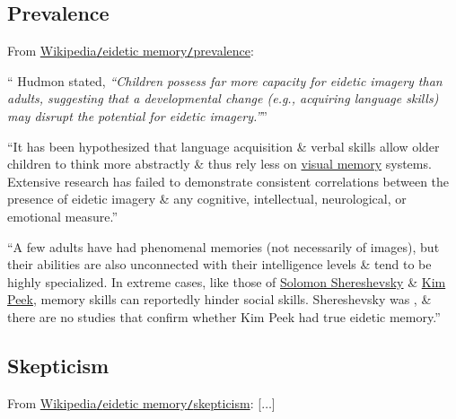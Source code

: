 \documentclass[oneside]{book}
\numberwithin{equation}{section}
\begin{document}
\subsection{Prevalence}
From \href{https://en.wikipedia.org/wiki/Eidetic_memory#Prevalence}{Wikipedia\texttt{/}eidetic memory\texttt{/}prevalence}:

`` Hudmon stated, \textit{``Children possess far more capacity for eidetic imagery than adults, suggesting that a developmental change (e.g., acquiring language skills) may disrupt the potential for eidetic imagery.''}''

``It has been hypothesized that language acquisition \& verbal skills allow older children to think more abstractly \& thus rely less on \href{https://en.wikipedia.org/wiki/Visual_memory}{visual memory} systems. Extensive research has failed to demonstrate consistent correlations between the presence of eidetic imagery \& any cognitive, intellectual, neurological, or emotional measure.''

``A few adults have had phenomenal memories (not necessarily of images), but their abilities are also unconnected with their intelligence levels \& tend to be highly specialized. In extreme cases, like those of \href{https://en.wikipedia.org/wiki/Solomon_Shereshevsky}{Solomon Shereshevsky} \& \href{https://en.wikipedia.org/wiki/Kim_Peek}{Kim Peek}, memory skills can reportedly hinder social skills. Shereshevsky was , \& there are no studies that confirm whether Kim Peek had true eidetic memory.''

\subsection{Skepticism}
From \href{https://en.wikipedia.org/wiki/Eidetic_memory#Skepticism}{Wikipedia\texttt{/}eidetic memory\texttt{/}skepticism}: [$\ldots$]
\end{document}
